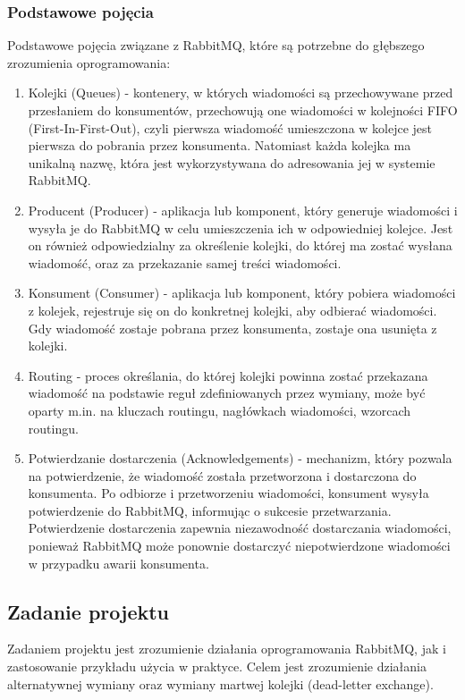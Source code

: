 \documentclass[12pt,twoside]{article}
\begin{document}
\subsubsection{Podstawowe pojęcia}
Podstawowe pojęcia związane z RabbitMQ, które są potrzebne do głębszego zrozumienia oprogramowania:
\begin{enumerate}[label=\alph*), leftmargin=1.25cm]
	\item Kolejki (Queues) - kontenery, w których wiadomości są przechowywane przed przesłaniem do konsumentów, przechowują one wiadomości w kolejności FIFO (First-In-First-Out), czyli pierwsza wiadomość umieszczona w kolejce jest pierwsza do pobrania przez konsumenta. Natomiast każda kolejka ma unikalną nazwę, która jest wykorzystywana do adresowania jej w systemie RabbitMQ.
	\item Producent (Producer) - aplikacja lub komponent, który generuje wiadomości i wysyła je do RabbitMQ w celu umieszczenia ich w odpowiedniej kolejce. Jest on również odpowiedzialny za określenie kolejki, do której ma zostać wysłana wiadomość, oraz za przekazanie samej treści wiadomości.
	\item Konsument (Consumer) - aplikacja lub komponent, który pobiera wiadomości z kolejek, rejestruje się on do konkretnej kolejki, aby odbierać wiadomości. Gdy wiadomość zostaje pobrana przez konsumenta, zostaje ona usunięta z kolejki.
	\item Routing - proces określania, do której kolejki powinna zostać przekazana wiadomość na podstawie reguł zdefiniowanych przez wymiany, może być oparty m.in. na kluczach routingu, nagłówkach wiadomości, wzorcach routingu.
	\item Potwierdzanie dostarczenia (Acknowledgements) - mechanizm, który pozwala na potwierdzenie, że wiadomość została przetworzona i dostarczona do konsumenta.	Po odbiorze i przetworzeniu wiadomości, konsument wysyła potwierdzenie do RabbitMQ, informując o sukcesie przetwarzania. Potwierdzenie dostarczenia zapewnia niezawodność dostarczania wiadomości, ponieważ RabbitMQ może ponownie dostarczyć niepotwierdzone wiadomości w przypadku awarii konsumenta.
	
\end{enumerate}
\subsection{Zadanie projektu}
Zadaniem projektu jest zrozumienie działania oprogramowania RabbitMQ, jak i zastosowanie przykładu użycia w praktyce. Celem jest zrozumienie działania alternatywnej wymiany oraz wymiany martwej kolejki (dead-letter exchange).
\end{document}
